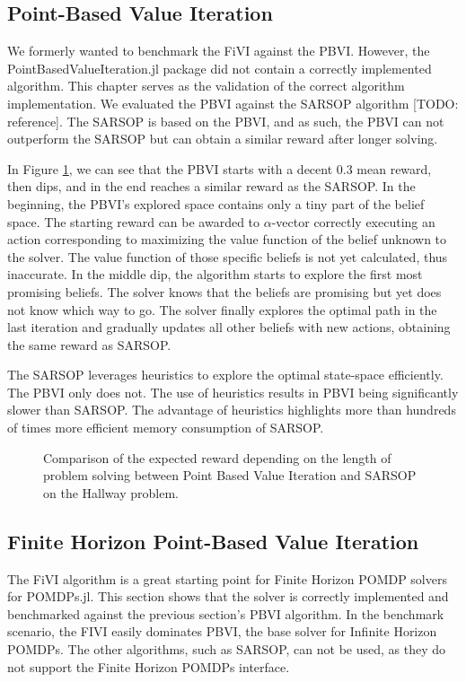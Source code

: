 \subsection{Point-Based Value Iteration}
We formerly wanted to benchmark the FiVI against the PBVI. However, the PointBasedValueIteration.jl package did not contain a correctly implemented algorithm. This chapter serves as the validation of the correct algorithm implementation. We evaluated the PBVI against the SARSOP algorithm [TODO: reference]. The SARSOP is based on the PBVI, and as such, the PBVI can not outperform the SARSOP but can obtain a similar reward after longer solving.


In Figure \ref{graph3}, we can see that the PBVI starts with a decent 0.3 mean reward, then dips, and in the end reaches a similar reward as the SARSOP. In the beginning, the PBVI's explored space contains only a tiny part of the belief space. The starting reward can be awarded to $\alpha$-vector correctly executing an action corresponding to maximizing the value function of the belief unknown to the solver. The value function of those specific beliefs is not yet calculated, thus inaccurate. In the middle dip, the algorithm starts to explore the first most promising beliefs. The solver knows that the beliefs are promising but yet does not know which way to go. The solver finally explores the optimal path in the last iteration and gradually updates all other beliefs with new actions, obtaining the same reward as SARSOP.

The SARSOP leverages heuristics to explore the optimal state-space efficiently. The PBVI only does not. The use of heuristics results in PBVI being significantly slower than SARSOP. The advantage of heuristics highlights more than hundreds of times more efficient memory consumption of SARSOP.


\begin{figure}[ht]
    \centering
    \caption{Comparison of the expected reward depending on the length of problem solving between Point Based Value Iteration and SARSOP on the Hallway problem.}
    \label{graph3}
\end{figure}


\subsection{Finite Horizon Point-Based Value Iteration}
The FiVI algorithm is a great starting point for Finite Horizon POMDP solvers for POMDPs.jl. This section shows that the solver is correctly implemented and benchmarked against the previous section's PBVI algorithm. In the benchmark scenario, the FIVI easily dominates PBVI, the base solver for Infinite Horizon POMDPs. The other algorithms, such as SARSOP, can not be used, as they do not support the Finite Horizon POMDPs interface. 

